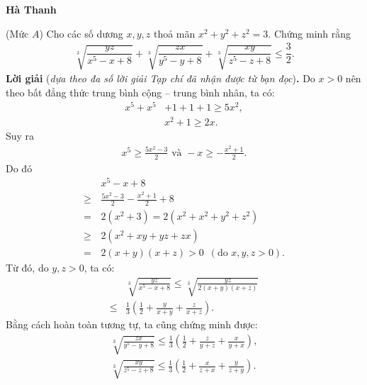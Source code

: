 \begin{multicols}{2}
	\begin{flushright}
		\textbf{\color{thachthuctoanhoc}Hà Thanh}
	\end{flushright}
	{}
	(Mức $A$) Cho các số dương $x,y,z$ thoả mãn $x^2+y^2+z^2=3$. Chứng minh rằng
	\begin{align*}
		\sqrt[3]{\dfrac{y z}{x^5\!-\!x\!+\!8}}\!+\!\sqrt[3]{\dfrac{z x}{y^5\!-\!y\!+\!8}}\!+\!\sqrt[3]{\dfrac{x y}{z^5\!-\!z\!+\!8}} \!\le\! \dfrac{3}{2}.
	\end{align*}
	\textbf{\color{thachthuctoanhoc}Lời giải} (\textit{dựa theo đa số lời giải Tạp chí đã nhận được từ bạn đọc})\textbf{\color{thachthuctoanhoc}.}
	\vskip 0.05cm
	Do $x > 0$ nên theo bất đẳng thức trung bình cộng -- trung bình nhân, ta có:
	\begin{align*}
		{x^5} + {x^5} &+ 1 + 1 + 1 \ge 5{x^2},\\
		&{x^2} + 1 \ge 2x.
	\end{align*}
	Suy ra
	\begin{align*}
		{x^5} \ge \frac{{5{x^2} - 3}}{2} \text{ và }  - x \ge  - \frac{{{x^2} + 1}}{2}.
	\end{align*}
	Do đó
	\begin{align*}
			&{x^5} - x + 8 \\
			\ge \,&\frac{{5{x^2} - 3}}{2} - \frac{{{x^2} + 1}}{2} + 8 \\
			= \,&2\left( {{x^2} + 3} \right) = 2\left( {{x^2} + {x^2} + {y^2} + {z^2}} \right)\\
			 \ge \,&2\left( {{x^2} + xy + yz + zx} \right) \\
			 = \,&2\left( {x + y} \right)\left( {x + z} \right) > 0\,\,\,\left( {{\text{do }}x,y,z > 0} \right).
	\end{align*}
	Từ đó, do $y, z > 0$, ta có:
	\begin{align*}
		&\sqrt[3]{{\frac{{yz}}{{{x^5} - x + 8}}}} \le \sqrt[3]{{\frac{{yz}}{{2\left( {x + y} \right)\left( {x + z} \right)}}}} \\
		\le &\frac{1}{3}\left( {\frac{1}{2} + \frac{y}{{x + y}} + \frac{z}{{x + z}}} \right). \tag{$1$}
	\end{align*}
	Bằng cách hoàn toàn tương tự, ta cũng chứng minh được:
	\begin{align*}
		\sqrt[3]{{\frac{{zx}}{{{y^5} \!-\! y \!+\! 8}}}} \!\le\! \frac{1}{3}\!\left( {\frac{1}{2} \!+\! \frac{z}{{y \!+\! z}} \!+\! \frac{x}{{y \!+\! x}}} \right)\!\!, \tag{$2$}\\
		\sqrt[3]{{\frac{{xy}}{{{z^5} \!-\! z \!+\! 8}}}} \!\le\! \frac{1}{3}\!\left( {\frac{1}{2} \!+\! \frac{x}{{z \!+\! x}} \!+\! \frac{y}{{z \!+\! y}}} \right)\!\!. \tag{$3$}

\end{align*}
\end{multicols}
